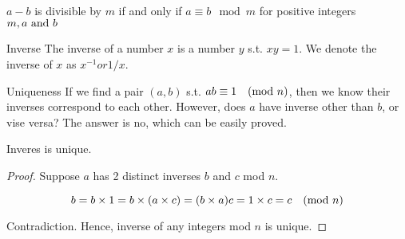 
\begin{mysubsection}{}
    \begin{definition}[def:]{}
        $a-b$ is divisible by $m$ if and only if $a\equiv b \mod m$ \qquad for positive integers $m, a \textnormal{ and }b$
    \end{definition}

    \begin{definition}[def:]{Inverse}
        The inverse of a number $x$ is a number $y$ s.t. $xy=1$. We denote the inverse of $x$ as $x^{-1} or 1/x$.
    \end{definition}
\end{mysubsection}

\begin{example}[exp:]{}
\end{example}

\begin{shortque}[]{}

\end{shortque}

\mynewpage
\begin{mysubsection}{Uniqueness}
    If we find a pair $(a,b)$ s.t. $ab\equiv 1\quad (\textnormal{mod }n)$, then we know their inverses correspond to each other. However, does $a$ have inverse other than $b$, or vise versa? The answer is no, which can be easily proved.

    \myframebreak
    \begin{theorem}[thm:]{}
        Inveres is unique.
    \end{theorem}

    \begin{proof}
        Suppose $a$ has 2 distinct inverses $b$ and $c$ mod $n$.

        \begin{equation*}
            b=b\times 1=b\times (a\times c)=(b\times a)c=1\times c=c\quad (\textnormal{mod }n)
        \end{equation*}

        Contradiction. Hence, inverse of any integers mod $n$ is unique.
    \end{proof}
\end{mysubsection}

